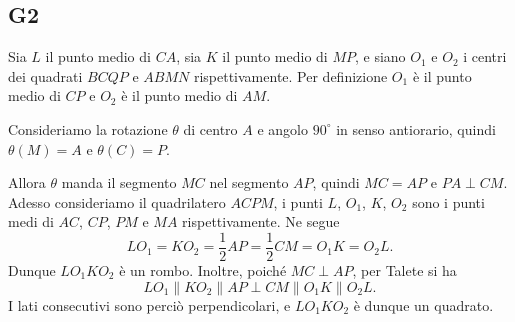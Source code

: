 \documentclass[11pt]{scrartcl}
\begin{document}
\subsection{G2}
Sia $L$ il punto medio di $CA$, sia $K$ il punto medio di $MP$, e siano $O_1$ e $O_2$
i centri dei quadrati $BCQP$ e $ABMN$ rispettivamente.
Per definizione $O_1$ è il punto medio di $CP$ e $O_2$ è il punto medio di $AM$.

Consideriamo la rotazione $\theta$ di centro $A$ e angolo $90^\circ$ in
senso antiorario, quindi  $\theta(M)=A$ e $\theta(C)=P$.

Allora $\theta$ manda il segmento $MC$ nel segmento $AP$, quindi $MC=AP$ e
$PA\perp CM$.
Adesso consideriamo il quadrilatero $ACPM$, i punti $L$, $O_1$, $K$, $O_2$
sono i punti medi di $AC$, $CP$, $PM$ e $MA$ rispettivamente.
Ne segue
\[
LO_1=KO_2=\frac12 AP=\frac12 CM=O_1K=O_2L.
\]
Dunque $LO_1KO_2$ è un rombo. Inoltre, poiché $MC\perp AP$, per Talete si ha
\[
LO_1\parallel KO_2\parallel AP\perp CM\parallel O_1K\parallel O_2L.
\]
I lati consecutivi sono perciò perpendicolari, e $LO_1KO_2$ è dunque un quadrato.
\end{document}
